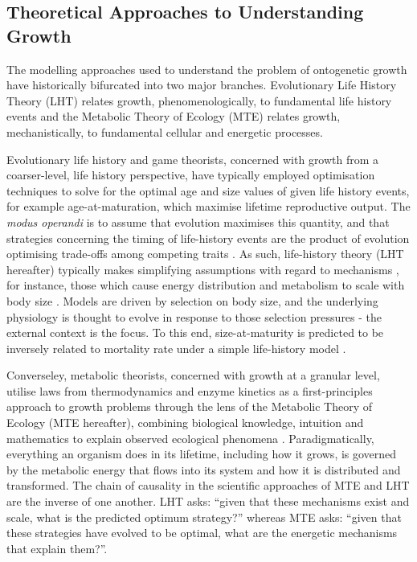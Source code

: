 \documentclass[a4paper]{article} %
\begin{document}
    \subsection{Theoretical Approaches to Understanding Growth}
        The modelling approaches used to understand the problem of ontogenetic growth have historically bifurcated into two major branches. Evolutionary Life History Theory (LHT) relates growth, phenomenologically, to fundamental life history events and the Metabolic Theory of Ecology (MTE) relates growth, mechanistically, to fundamental cellular and energetic processes.
        
        Evolutionary life history and game theorists, concerned with growth from a coarser-level, life history perspective, have typically employed optimisation techniques to solve for the optimal age and size values of given life history events, for example age-at-maturation, which maximise lifetime reproductive output. The \textit{modus operandi} is to assume that evolution maximises this quantity, and that strategies concerning the timing of life-history events are the product of evolution optimising trade-offs among competing traits \autocite{Day1997, Stearns1989, stearns1992evolution}. As such, life-history theory (LHT hereafter) typically makes simplifying assumptions with regard to mechanisms \autocite{Day1997, Kozowski1987-indeterminate}, for instance, those which cause energy distribution and metabolism to scale with body size \autocite{peters1983,Werner1988,brown2000-scaling-book}. Models are driven by selection on body size, and the underlying physiology is thought to evolve in response to those selection pressures - the external context is the focus. To this end, size-at-maturity is predicted to be inversely related to mortality rate under a simple life-history model \autocite{stearns1992evolution}.
        
        Converseley, metabolic theorists, concerned with growth at a granular level, utilise laws from thermodynamics and enzyme kinetics as a first-principles approach to growth problems through the lens of the Metabolic Theory of Ecology (MTE hereafter), combining biological knowledge, intuition and mathematics to explain observed ecological phenomena \autocite{Brown2004}. Paradigmatically, everything an organism does in its lifetime, including how it grows, is governed by the metabolic energy that flows into its system and how it is distributed and transformed. The chain of causality in the scientific approaches of MTE and LHT are the inverse of one another. LHT asks: ``given that these mechanisms exist and scale, what is the predicted optimum strategy?'' whereas MTE asks: ``given that these strategies have evolved to be optimal, what are the energetic mechanisms that explain them?''.
        
\end{document}
